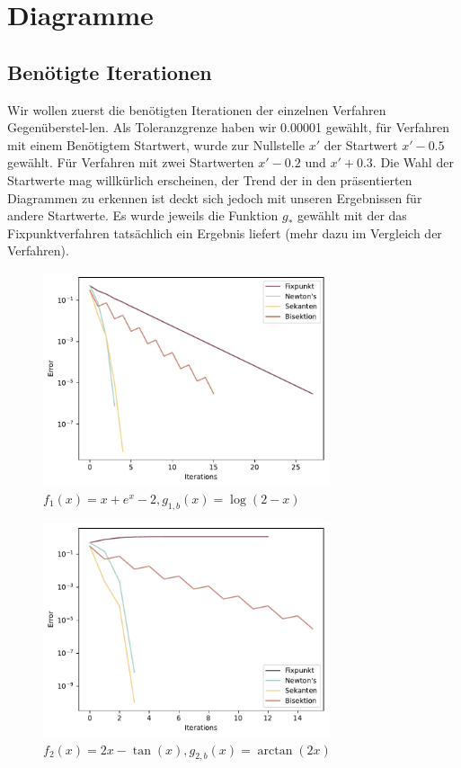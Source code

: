 \documentclass[a4paper,12pt]{article}
\newcommand{\1}{1\hspace{-0,9ex}1}
\begin{document}
\section*{Diagramme}
\subsection*{Benötigte Iterationen}
Wir wollen zuerst die benötigten Iterationen der einzelnen Verfahren Gegenüberstel-len. Als Toleranzgrenze haben wir 0.00001 gewählt, für Verfahren mit einem Benötigtem Startwert, wurde zur Nullstelle $x'$ der Startwert $x'-0.5$ gewählt. Für Verfahren mit zwei Startwerten $x'-0.2$ und $x'+0.3$. Die Wahl der Startwerte mag willkürlich erscheinen, der Trend der in den präsentierten Diagrammen zu erkennen ist deckt sich jedoch mit unseren Ergebnissen für andere Startwerte. Es wurde jeweils die Funktion $g_*$ gewählt mit der das Fixpunktverfahren tatsächlich ein Ergebnis liefert (mehr dazu im Vergleich der Verfahren).

\begin{figure}[H]
	\centering
	\includegraphics[width=0.75\textwidth]{plots/error_series_plot.pdf}
	\caption{$f_1(x) = x + e^x-2, g_{1,b}(x)=\log(2-x)$}
\end{figure}

\begin{figure}[H]
	\centering
	\includegraphics[width=0.75\textwidth]{plots/error_series_plot(1).pdf}
	\caption{$f_2(x) = 2x - \tan(x), g_{2,b}(x)=\arctan(2x)$}
\end{figure}
\end{document}
